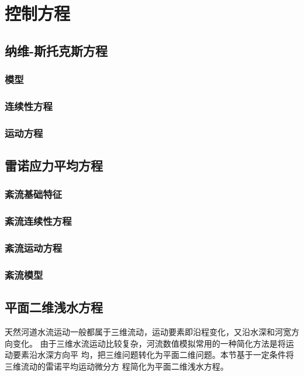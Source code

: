 \chapter{控制方程}
\section{纳维-斯托克斯方程}
\subsection{模型}
\subsection{连续性方程}
\subsection{运动方程}
\section{雷诺应力平均方程}
\subsection{紊流基础特征}
\subsection{紊流连续性方程}
\subsection{紊流运动方程}
\subsection{紊流模型}
\section{平面二维浅水方程}
天然河道水流运动一般都属于三维流动，运动要素即沿程变化，又沿水深和河宽方向变化。
由于三维水流运动比较复杂，河流数值模拟常用的一种简化方法是将运动要素沿水深方向平
均，把三维问题转化为平面二维问题。本节基于一定条件将三维流动的雷诺平均运动微分方
程简化为平面二维浅水方程。
